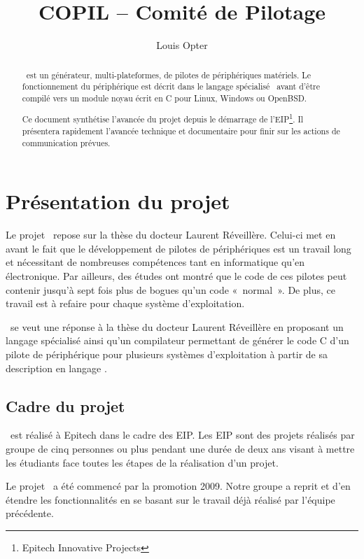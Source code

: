 \documentclass[francais]{rtxreport}
\author{Louis Opter} \title{COPIL -- Comité de Pilotage}
\begin{document}
\maketitle

\begin{abstract}
\rtx\ est un générateur, multi-plateformes, de pilotes de périphériques
matériels. Le fonctionnement du périphérique est décrit dans le langage
spécialisé \rtx\ avant d'être compilé vers un module noyau écrit en C pour
Linux, Windows ou OpenBSD.

Ce document synthétise l'avancée du projet depuis le démarrage de
l'EIP\footnote{Epitech Innovative Projects}. Il présentera rapidement l’avancée
technique et documentaire pour finir sur les actions de communication prévues.
\end{abstract}

\rtxmaketitleblock

\tableofcontents

\chapter{Présentation du projet}

Le projet \rtx\ repose sur la thèse du docteur Laurent Réveillère. Celui-ci met
en avant le fait que le développement de pilotes de périphériques est un travail
long et nécessitant de nombreuses compétences tant en informatique qu'en
électronique. Par ailleurs, des études ont montré que le code de ces pilotes
peut contenir jusqu'à sept fois plus de bogues qu'un code «~normal~». De plus,
ce travail est à refaire pour chaque système d'exploitation.

\rtx\ se veut une réponse à la thèse du docteur Laurent Réveillère en proposant
un langage spécialisé ainsi qu'un compilateur permettant de générer le code C
d'un pilote de périphérique pour plusieurs systèmes d'exploitation à partir de
sa description en langage \rtx.

\section{Cadre du projet}
\rtx\ est réalisé à Epitech dans le cadre des EIP. Les EIP sont des projets
réalisés par groupe de cinq personnes ou plus pendant une durée de deux ans
visant à mettre les étudiants face toutes les étapes de la réalisation d'un
projet.

Le projet \rtx\ a été commencé par la promotion 2009. Notre groupe a reprit et
d'en étendre les fonctionnalités en se basant sur le travail déjà réalisé par
l'équipe précédente.
\end{document}
